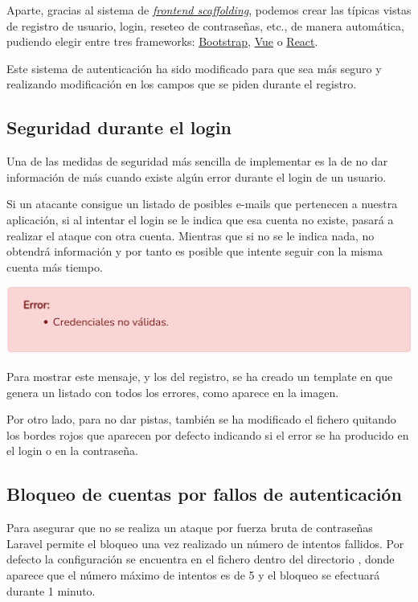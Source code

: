 \documentclass{\ClassPath/viu-tfm-template}
\begin{document}
Aparte, gracias al sistema de \textit{\href{https://laravel.com/docs/6.x/frontend}{frontend scaffolding}}, podemos crear las típicas vistas de registro de usuario, login, reseteo de contraseñas, etc., de manera automática, pudiendo elegir entre tres frameworks: \href{https://getbootstrap.com/}{Bootstrap}, \href{https://vuejs.org/}{Vue} o \href{https://es.reactjs.org/}{React}.

Este sistema de autenticación ha sido modificado para que sea más seguro y realizando modificación en los campos que se piden durante el registro.


\subsection{Seguridad durante el login}
Una de las medidas de seguridad más sencilla de implementar es la de no dar información de más cuando existe algún error durante el login de un usuario.

Si un atacante consigue un listado de posibles e-mails que pertenecen a nuestra aplicación, si al intentar el login se le indica que esa cuenta no existe, pasará a realizar el ataque con otra cuenta. Mientras que si no se le indica nada, no obtendrá información y por tanto es posible que intente seguir con la misma cuenta más tiempo.

\begin{center}
    \includegraphics[width=0.8\linewidth]{img/error_simple.png}
\end{center}

Para mostrar este mensaje, y los del registro, se ha creado un template en  que genera un listado con todos los errores, como aparece en la imagen.

Por otro lado, para no dar pistas, también se ha modificado el fichero  quitando los bordes rojos que aparecen por defecto indicando si el error se ha producido en el login o en la contraseña.


\subsection{Bloqueo de cuentas por fallos de autenticación}
Para asegurar que no se realiza un ataque por fuerza bruta  de contraseñas  Laravel permite el bloqueo una vez realizado un número de intentos fallidos. Por defecto la configuración se encuentra en el fichero  dentro del directorio , donde aparece que el número máximo de intentos es de 5 y el bloqueo se efectuará durante 1 minuto.
\end{document}
